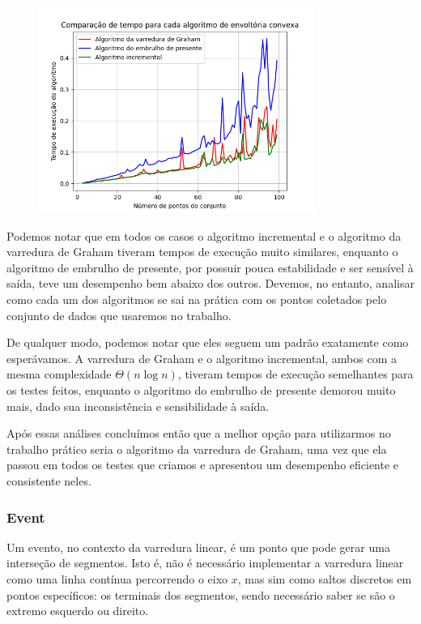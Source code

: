 \documentclass{article}
\begin{document}
\begin{figure} [H]
	\includegraphics[width=9cm]{normal.png}
	\centering
\end{figure}

Podemos notar que em todos os casos o algoritmo incremental e o algoritmo da varredura de Graham tiveram tempos de execução muito similares, enquanto o algoritmo de embrulho de presente, por possuir pouca estabilidade e ser sensível à saída, teve um desempenho bem abaixo dos outros. Devemos, no entanto, analisar como cada um dos algoritmos se sai na prática com os pontos coletados pelo conjunto de dados que usaremos no trabalho.

De qualquer modo, podemos notar que eles seguem um padrão exatamente como esperávamos. A varredura de Graham e o algoritmo incremental, ambos com a mesma complexidade \( \Theta(n \log n) \), tiveram tempos de execução semelhantes para os testes feitos, enquanto o algoritmo do embrulho de presente demorou muito mais, dado sua inconsistência e sensibilidade à saída.

Após essas análises concluímos então que a melhor opção para utilizarmos no trabalho prático seria o algoritmo da varredura de Graham, uma vez que ela passou em todos os testes que criamos e apresentou um desempenho eficiente e consistente neles.

\subsubsection{Event}

Um evento, no contexto da varredura linear, é um ponto que pode gerar uma interseção de segmentos. Isto é, não é necessário implementar a varredura linear como uma linha contínua percorrendo o eixo \( x \), mas sim como saltos discretos em pontos específicos: os terminais dos segmentos, sendo necessário saber se são o extremo esquerdo ou direito.
\end{document}
